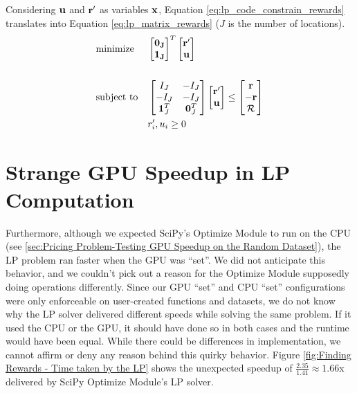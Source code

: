 \begin{appendices}
    Considering $\mathbf{u}$ and $\mathbf{r'}$ as variables $\mathbf{x}$, Equation \ref{eq:lp_code_constrain_rewards} translates into Equation \ref{eq:lp_matrix_rewards} ($J$ is the number of locations).
    \begin{equation} \label{eq:lp_matrix_rewards}
    \begin{aligned}
    & \text{minimize}
    & & \begin{bmatrix}
    \mathbf{0_J}\\
    \mathbf{1_J}\\
    \end{bmatrix}^T
    \begin{bmatrix}
    \mathbf{r'}\\
    \mathbf{u}
    \end{bmatrix}\\ \\
    & \text{subject to}
    & & \begin{bmatrix}
    I_J & -I_J\\
    -I_J & -I_J\\
    \mathbf{1}^T_J & \mathbf{0}^T_J\\
    \end{bmatrix}
    \begin{bmatrix}
    \mathbf{r'}\\
    \mathbf{u}\\
    \end{bmatrix} \leq
    \begin{bmatrix}
    \mathbf{r}\\
    -\mathbf{r}\\
    \mathcal{R}\\
    \end{bmatrix}\\
    &&& r'_i, u_i \geq 0
    \end{aligned}
    \end{equation}
    
    \section{Strange GPU Speedup in LP Computation} \label{sec:Strange GPU Speedup in LP Computation}
    Furthermore, although we expected SciPy's Optimize Module \cite{SCPOptimizeDocs} to run on the CPU (see \cref{sec:Pricing Problem-Testing GPU Speedup on the Random Dataset}), the LP problem ran faster when the GPU was ``set''. We did not anticipate this behavior, and we couldn't pick out a reason for the Optimize Module supposedly doing operations differently. Since our GPU ``set'' and CPU ``set'' configurations were only enforceable on user-created functions and datasets, we do not know why the LP solver delivered different speeds while solving the same problem. If it used the CPU or the GPU, it should have done so in both cases and the runtime would have been equal. While there could be differences in implementation, we cannot affirm or deny any reason behind this quirky behavior. Figure \ref{fig:Finding Rewards - Time taken by the LP} shows the unexpected speedup of $\frac{2.35}{1.41} \approx 1.66$x delivered by SciPy Optimize Module's LP solver.
    

\end{appendices}
